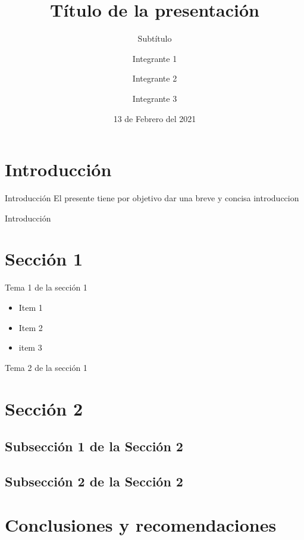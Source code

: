 \documentclass{beamer}
\title{Título de la presentación}
\subtitle{Subtítulo} %
\author{Integrante 1 \and Integrante 2 \and Integrante 3}
\institute[E.P.N]{Escuela Politécnica Nacional \par Facultad de Ingeniería en Sistemas \par Nombre de la materia}
\date{13 de Febrero del 2021} %
\begin{document}
    \frame{\titlepage}

    \frame{\tableofcontents}

    \section{Introducción}
    \begin{frame}{Introducción}
        El presente tiene por objetivo dar una breve y concisa introduccion
    \end{frame}
    \begin{frame}{Introducción}
    \end{frame}
    \section{Sección 1}
    \begin{frame}{Tema 1 de la sección 1}
	    \begin{itemize}
            \item Item 1
            \item Item 2
            \item item 3
        \end{itemize}
    \end{frame}
    \begin{frame}{Tema 2 de la sección 1}
    \end{frame}

    \section{Sección 2}
    \subsection{Subsección 1 de la Sección 2}
    \subsection{Subsección 2 de la Sección 2}

    \section{Conclusiones y recomendaciones}
\end{document}
